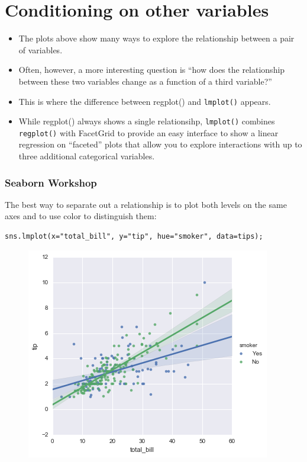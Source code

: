 \documentclass{beamer}
\begin{document}
\section{Conditioning on other variables}
\begin{frame}
	\begin{itemize}
\item The plots above show many ways to explore the relationship between a pair of variables.
\item Often, however, a more interesting question is “how does the relationship between these two variables change as a function of a third variable?” 
\item This is where the difference between regplot() and \texttt{lmplot()} appears. 
\item While regplot() always shows a single relationsihp, \texttt{lmplot()} combines \texttt{regplot()} with FacetGrid to provide an easy interface to show a linear regression on “faceted” plots that allow you to explore interactions with up to three additional categorical variables.
	\end{itemize}

\end{frame}
\begin{frame}[fragile]
	\frametitle{Seaborn Workshop}
\large

The best way to separate out a relationship is to plot both levels on the same axes and to use color to distinguish them:
\begin{verbatim}
sns.lmplot(x="total_bill", y="tip", hue="smoker", data=tips);
\end{verbatim}

\begin{figure}
	\centering
	\includegraphics[width=0.7\linewidth]{images/regression_39_0}
\end{figure}
\end{frame}
\end{document}
